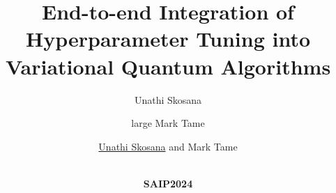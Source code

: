 \documentclass[xcolor={dvipsnames,rgb},169,t]{beamer}
\title{\textbf{End-to-end Integration of Hyperparameter Tuning into Variational Quantum Algorithms}}
\author{\large Unathi Skosana}
\author{large Mark Tame}
\author{\large \underline{Unathi Skosana} and Mark Tame}
\institute[shortinst]{\large\textbf{Stellenbosch University}}
\date{\\ \bigskip \large\textbf{SAIP2024}}
\begin{document}
{
  \begin{frame}[plain]
    \titlepage
  \end{frame}
}

%



% 
% 
% 
% 
% 
\end{document}
